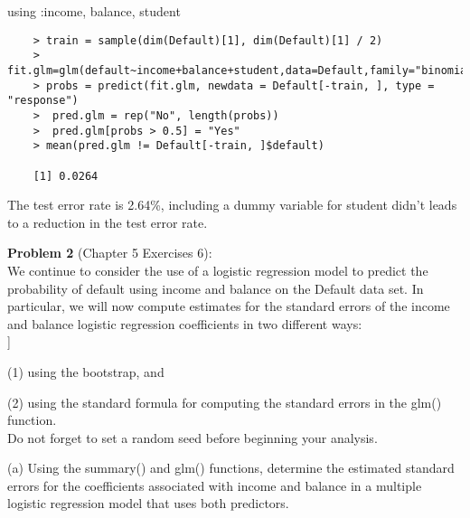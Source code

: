 \documentclass{article}
\begin{document}
using :income, balance, student
\begin{program}
	\begin{verbatim}
	> train = sample(dim(Default)[1], dim(Default)[1] / 2)
	>  fit.glm=glm(default~income+balance+student,data=Default,family="binomial",subset=train)
	> probs = predict(fit.glm, newdata = Default[-train, ], type = "response")
	>  pred.glm = rep("No", length(probs))
	>  pred.glm[probs > 0.5] = "Yes"	
	> mean(pred.glm != Default[-train, ]$default)
	
	[1] 0.0264
	\end{verbatim}
\end{program}

The test error rate is 2.64\%, including a dummy variable for student didn't leads to a reduction in the test error rate.


\newpage
{\bf Problem 2} (Chapter 5 Exercises 6):\\

We continue to consider the use of a logistic regression model to predict the probability of default using income and balance on the Default data set. In particular, we will now compute estimates for the standard errors of the income and balance logistic regression coefficients in two different ways: \\]

(1) using the bootstrap, and 

(2) using the standard formula for computing the standard errors in the glm() function.\\
 Do not forget to set a random seed before beginning your analysis.


(a) Using the summary() and glm() functions, determine the estimated standard errors for the coefficients associated with income and balance in a multiple logistic regression model that uses both predictors.
\end{document}
